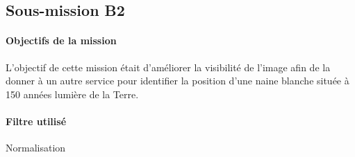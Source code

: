 \subsection{Sous-mission B2} 

	\begin{vwcol}[widths={0.8,0.2}, rule=0pt]
	\begin{minipage}{0.7\textwidth}
	\paragraph{Objectifs de la mission}

	L'objectif de cette mission était d'améliorer la visibilité de l'image afin de la donner à un autre service pour identifier la position d'une naine blanche située à 150 années lumière de la Terre.
	\end{minipage}
	\begin{minipage}{0.2\textwidth}
		\begin{flushright}
			\paragraph{Filtre utilisé}

			Normalisation
		\end{flushright}
	\end{minipage}
	\end{vwcol} 

